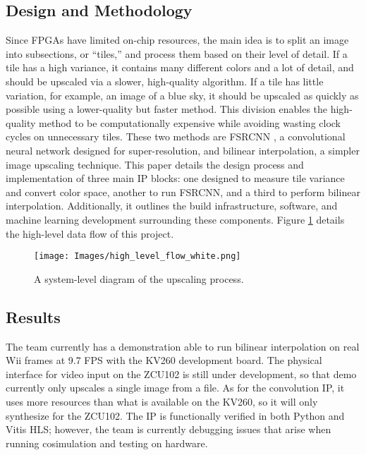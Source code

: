 \documentclass{article}
\begin{document}
\subsection*{Design and Methodology}
\noindent Since FPGAs have limited on-chip resources, the main idea is to split an image into subsections, or “tiles,” and process them based on their level of detail. If a tile has a high variance, it contains many different colors and a lot of detail, and should be upscaled via a slower, high-quality algorithm. If a tile has little variation, for example, an image of a blue sky, it should be upscaled as quickly as possible using a lower-quality but faster method. This division enables the high-quality method to be computationally expensive while avoiding wasting clock cycles on unnecessary tiles. These two methods are FSRCNN \cite{fsrcnn_dong_accelerating_2016}, a convolutional neural network designed for super-resolution, and bilinear interpolation, a simpler image upscaling technique. This paper details the design process and implementation of three main IP blocks: one designed to measure tile variance and convert color space, another to run FSRCNN, and a third to perform bilinear interpolation. Additionally, it outlines the build infrastructure, software, and machine learning development surrounding these components. Figure \ref{fig:high_lvl_block} details the high-level data flow of this project.

\begin{figure}[!tb] 
    \centering
    \texttt{[image: Images/high\_level\_flow\_white.png]} 
    \caption{A system-level diagram of the upscaling process.} %
    \label{fig:high_lvl_block} %
\end{figure}

\subsection*{Results}
\noindent The team currently has a demonstration able to run bilinear interpolation on real Wii frames at 9.7 FPS with the KV260 development board. The physical interface for video input on the ZCU102 is still under development, so that demo currently only upscales a single image from a file. As for the convolution IP, it uses more resources than what is available on the KV260, so it will only synthesize for the ZCU102. The IP is functionally verified in both Python and Vitis HLS; however, the team is currently debugging issues that arise when running cosimulation and testing on hardware.
\end{document}
